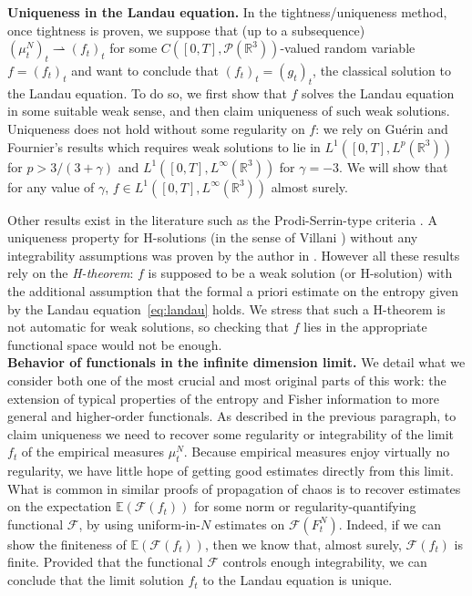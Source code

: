 \documentclass[11pt,a4paper]{article}
\theoremstyle{definition}
\theoremstyle{plain}
\begin{document}
\textbf{Uniqueness in the Landau equation.} In the tightness/uniqueness method, once tightness is proven, we suppose that (up to a subsequence) $(\mu^N_t)_t \rightharpoonup (f_t)_t$ for some $C([0,T],\mathcal{P}(\mathbb{R}^3))$-valued random variable $f=(f_t)_t$ and want to conclude that $(f_t)_t=(g_t)_t$, the classical solution to the Landau equation. To do so, we first show that $f$ solves the Landau equation in some suitable weak sense, and then claim uniqueness of such weak solutions. Uniqueness does not hold without some regularity on $f$: we rely on Guérin and Fournier's results \cite{GuerinFournier2008, Fournier2010} which requires weak solutions to lie in $L^1([0,T],L^p(\mathbb{R}^3))$ for $p>3/(3+\gamma)$ and $L^1([0,T],L^\infty(\mathbb{R}^3))$ for $\gamma=-3$. We will show that for any value of $\gamma$, $f\in L^1([0,T],L^\infty(\mathbb{R}^3))$ almost surely.

Other results exist in the literature such as the Prodi-Serrin-type criteria \cite{AlonsoBaglandDesvillettes2024, ChernGualdani2022}. A uniqueness property for H-solutions (in the sense of Villani \cite{Villani1998}) without any integrability assumptions was proven by the author in \cite{Tabary2025}. However all these results rely on the \textit{H-theorem}: $f$ is supposed to be a weak solution (or H-solution) with the additional assumption that the formal a priori estimate on the entropy given by the Landau equation~\eqref{eq:landau} holds. We stress that such a H-theorem is not automatic for weak solutions, so checking that $f$ lies in the appropriate functional space would not be enough.
\\

\textbf{Behavior of functionals in the infinite dimension limit.} We detail what we consider both one of the most crucial and most original parts of this work: the extension of typical properties of the entropy and Fisher information to more general and higher-order functionals. As described in the previous paragraph, to claim uniqueness we need to recover some regularity or integrability of the limit $f_t$ of the empirical measures $\mu^N_t$. Because empirical measures enjoy virtually no regularity, we have little hope of getting good estimates directly from this limit. What is common in similar proofs of propagation of chaos \cite{FournierHauray2015,Salem2019,Salem2019a} is to recover estimates on the expectation $\mathbb{E}(\mathcal{F}(f_t))$ for some norm or regularity-quantifying functional $\mathcal{F}$, by using uniform-in-$N$ estimates on $\mathcal{F}(F^N_t)$. Indeed, if we can show the finiteness of $\mathbb{E}(\mathcal{F}(f_t))$, then we know that, almost surely, $\mathcal{F}(f_t)$ is finite. Provided that the functional $\mathcal{F}$ controls enough integrability, we can conclude that the limit solution $f_t$ to the Landau equation is unique.
\end{document}

